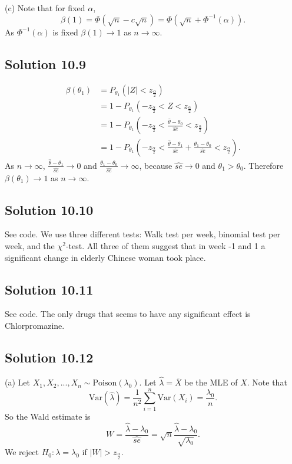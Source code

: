 (c) Note that for fixed $\alpha$,
$$
\beta(1) = \Phi(\sqrt{n} - c\sqrt{n}) = \Phi(\sqrt{n} + \Phi^{-1}(\alpha)).
$$
As $\Phi^{-1}(\alpha)$ is fixed $\beta(1) \to 1$ as $n \to \infty$.


\subsection*{Solution 10.9}
\begin{equation*}
\begin{split}
\beta(\theta_1) &= P_{\theta_1}(|Z| < z_{\frac{\alpha}{2}}) \\
    &= 1 - P_{\theta_1}(-z_{\frac{\alpha}{2}} < Z < z_{\frac{\alpha}{2}}) \\
    &= 1 - P_{\theta_1}\left(-z_{\frac{\alpha}{2}} < \frac{\hat{\theta} - \theta_0}{\hat{se}} < z_{\frac{\alpha}{2}}\right) \\
    &= 1 - P_{\theta_1}\left(-z_{\frac{\alpha}{2}} < \frac{\hat{\theta} - \theta_1}{\hat{se}} + \frac{\theta_1 - \theta_0}{\hat{se}} < z_{\frac{\alpha}{2}}\right).
\end{split}
\end{equation*}
As $n \to \infty$, $\frac{\hat{\theta} - \theta_1}{\hat{se}} \to 0$ and $\frac{\theta_1 - \theta_0}{\hat{se}} \to \infty$, because $\hat{se} \to 0$ and $\theta_1 > \theta_0$.
Therefore $\beta(\theta_1) \to 1$ as $n \to \infty$.


\subsection*{Solution 10.10}

See code.
We use three different tests: Walk test per week, binomial test per week, and the $\chi^2$-test.
All three of them suggest that in week -1 and 1 a significant change in elderly Chinese woman took place.


\subsection*{Solution 10.11}

See code.
The only drugs that seems to have any significant effect is Chlorpromazine.


\subsection*{Solution 10.12}

(a) Let $X_1, X_2, ..., X_n \sim \mathrm{Poison}(\lambda_0)$.
Let $\hat{\lambda} = \overline{X}$ be the MLE of $X$.
Note that
$$
\mathrm{Var}(\hat{\lambda}) = \frac{1}{n^2} \sum_{i=1}^n \mathrm{Var}(X_i) = \frac{\lambda_0}{n}.
$$
So the Wald estimate is
$$
W = \frac{\hat{\lambda} - \lambda_0}{\hat{se}} = \sqrt{n} \frac{\hat{\lambda} - \lambda_0}{\sqrt{\lambda_0}}.
$$
We reject $H_0: \lambda = \lambda_0$ if $|W| > z_{\frac{\alpha}{2}}$.

